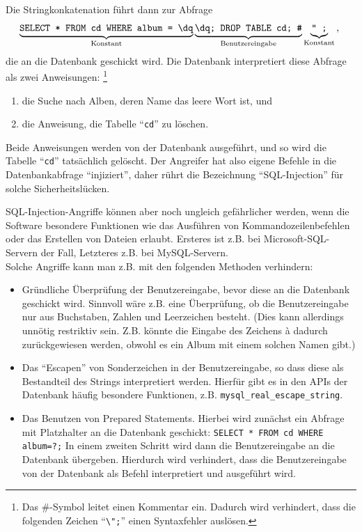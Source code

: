Die Stringkonkatenation führt dann zur Abfrage
\begin{equation*}
	\underbrace{\texttt{SELECT * FROM cd WHERE album = \dq}}_{\mathrm{Konstant}}
	\underbrace{\texttt{\dq; DROP TABLE cd; \#}}_{\mathrm{Benutzereingabe}}
	\underbrace{\text{\ttfamily "\phantom{"};}}_{\mathrm{Konstant}} \text{, }
\end{equation*}
die an die Datenbank geschickt wird. Die Datenbank interpretiert diese Abfrage als zwei Anweisungen:%
\footnote{Das \#-Symbol leitet einen Kommentar ein. Dadurch wird verhindert, dass die folgenden Zeichen "`\lstinline+\";+"' einen Syntaxfehler auslösen.}
\begin{enumerate}
	\item die Suche nach Alben, deren Name das leere Wort ist, und
	\item die Anweisung, die Tabelle "`\lstinline+cd+"' zu löschen.
\end{enumerate}
Beide Anweisungen werden von der Datenbank ausgeführt, und so wird die Tabelle "`\lstinline+cd+"' tatsächlich gelöscht. Der Angreifer hat also eigene Befehle in die Datenbankabfrage "`injiziert"', daher rührt die Bezeichnung "`SQL-Injection"' für solche Sicherheitslücken.

SQL-Injection-Angriffe können aber noch ungleich gefährlicher werden, wenn die Software besondere Funktionen wie das Ausführen von Kommandozeilenbefehlen oder das Erstellen von Dateien erlaubt.
Ersteres ist z.B. bei Microsoft-SQL-Servern der Fall, Letzteres z.B. bei MySQL-Servern.\\

Solche Angriffe kann man z.B. mit den folgenden Methoden verhindern:
\begin{itemize}
	\item Gründliche Überprüfung der Benutzereingabe, bevor diese an die Datenbank geschickt wird.
	Sinnvoll wäre z.B. eine Überprüfung, ob die Benutzereingabe nur aus Buchstaben, Zahlen und Leerzeichen besteht.
	(Dies kann allerdings unnötig restriktiv sein. Z.B. könnte die Eingabe des Zeichens \`a dadurch zurückgewiesen werden, obwohl es ein Album mit einem solchen Namen gibt.)
	\item Das "`Escapen"' von Sonderzeichen in der Benutzereingabe, so dass diese als Bestandteil des Strings interpretiert werden.
	Hierfür gibt es in den APIs der Datenbank häufig besondere Funktionen, z.B. \lstinline+mysql_real_escape_string+.
	\item Das Benutzen von Prepared Statements. Hierbei wird zunächst ein Abfrage mit Platzhalter an die Datenbank geschickt:
\lstinline+SELECT * FROM cd WHERE album=?;+
	In einem zweiten Schritt wird dann die Benutzereingabe an die Datenbank übergeben.
	Hierdurch wird verhindert, dass die Benutzereingabe von der Datenbank als Befehl interpretiert und ausgeführt wird.
\end{itemize}


